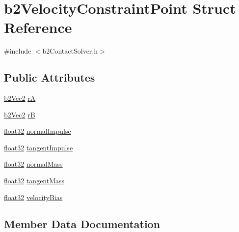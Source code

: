 \hypertarget{structb2_velocity_constraint_point}{}\section{b2\+Velocity\+Constraint\+Point Struct Reference}
\label{structb2_velocity_constraint_point}


{\ttfamily \#include $<$b2\+Contact\+Solver.\+h$>$}

\subsection*{Public Attributes}
\begin{DoxyCompactItemize}
\item 
\mbox{\hyperlink{structb2_vec2}{b2\+Vec2}} \mbox{\hyperlink{structb2_velocity_constraint_point_a0be704259cd5d3902d8581e186546e5e}{rA}}
\item 
\mbox{\hyperlink{structb2_vec2}{b2\+Vec2}} \mbox{\hyperlink{structb2_velocity_constraint_point_ab5d1c98e09e2f859b71f6d0fda46c0d5}{rB}}
\item 
\mbox{\hyperlink{b2_settings_8h_aacdc525d6f7bddb3ae95d5c311bd06a1}{float32}} \mbox{\hyperlink{structb2_velocity_constraint_point_a304653be2ca1c1daa72d7b7868b37b11}{normal\+Impulse}}
\item 
\mbox{\hyperlink{b2_settings_8h_aacdc525d6f7bddb3ae95d5c311bd06a1}{float32}} \mbox{\hyperlink{structb2_velocity_constraint_point_ac3e3be335d204bb6a89a7303831cc89b}{tangent\+Impulse}}
\item 
\mbox{\hyperlink{b2_settings_8h_aacdc525d6f7bddb3ae95d5c311bd06a1}{float32}} \mbox{\hyperlink{structb2_velocity_constraint_point_a5997e9781cedbd86333a84a967b59c33}{normal\+Mass}}
\item 
\mbox{\hyperlink{b2_settings_8h_aacdc525d6f7bddb3ae95d5c311bd06a1}{float32}} \mbox{\hyperlink{structb2_velocity_constraint_point_a029692226a637f5e687022041b25043c}{tangent\+Mass}}
\item 
\mbox{\hyperlink{b2_settings_8h_aacdc525d6f7bddb3ae95d5c311bd06a1}{float32}} \mbox{\hyperlink{structb2_velocity_constraint_point_a81d492345d9b1c8f51ec10154ab840f2}{velocity\+Bias}}
\end{DoxyCompactItemize}


\subsection{Member Data Documentation}
\mbox{\label{structb2_velocity_constraint_point_a304653be2ca1c1daa72d7b7868b37b11}} 
